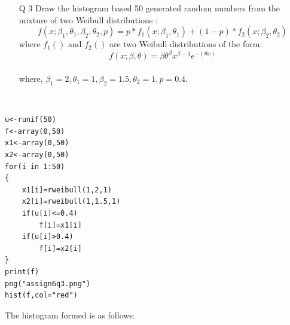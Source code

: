 \documentclass[12pt]{book}
\begin{document}
\newpage
\begin{enumerate}
\item[Q 3] Draw the histogram based 50 generated random numbers from the mixture of
two Weibull distributions :
$$f (x; \beta_1 , \theta_1 , \beta_2 , \theta_2 , p) = p*f_1 (x; \beta_1 , \theta_1 ) + (1-p)*f_2 (x; \beta_2 , \theta_2 )$$
where $f_1 ()$ and $f_2 ()$ are two Weibull distributions of the form:\\ $$f (x; \beta, \theta) =
\beta \theta^\beta x^{\beta-1} e^{−(\theta x)}$$ \\where, $\beta_1 = 2, \theta_1 = 1, \beta_2 = 1.5, \theta_2 = 1, p = 0.4$.
\end{enumerate}
\\
\begin{lstlisting}
u<-runif(50)
f<-array(0,50)
x1<-array(0,50)
x2<-array(0,50)
for(i in 1:50)
{
	x1[i]=rweibull(1,2,1)
	x2[i]=rweibull(1,1.5,1)
	if(u[i]<=0.4)
		f[i]=x1[i]
	if(u[i]>0.4)
		f[i]=x2[i]
}
print(f)
png("assign6q3.png")
hist(f,col="red")
\end{lstlisting}
\newpage
The histogram formed is as follows: \\
\begin{figure}[H]
	\centering
\end{figure}
\end{document}
